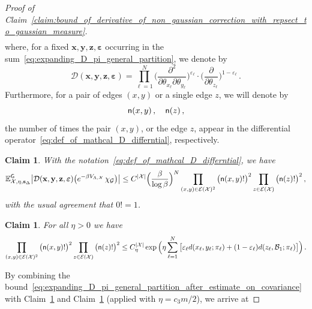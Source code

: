 \documentclass[11pt]{article}
\newtheorem{claim}[theorem]{Claim}
\theoremstyle{definition}
\theoremstyle{remark}
\numberwithin{theorem}{section}
\def\eps{{\varepsilon}}
\def\La{{\Lambda}}
\newcommand{\bE}{\mathbb E}
\newcommand{\cE}{\mathcal{E}}
\begin{document}
\begin{proof}[Proof of Claim~\ref{claim:bound_of_derivative_of_non_gaussian_correction_with_repsect_to_gaussian_measure}]
\begin{align}
        \end{align}
        where, for a fixed $\mathbf{x},\mathbf{y},\mathbf{z}, \boldsymbol{\eps}$ occurring in the sum~\eqref{eq:expanding_D_pi_general_partition}, we denote by 
        \begin{equation} \label{eq:def_of_mathcal_D_differntial}
           \mathcal{D}(\mathbf{x},\mathbf{y},\mathbf{z}, \boldsymbol{\eps} ) = \prod_{\ell=1}^{N} \Big(\frac{\partial^2}{\partial \theta_{x_\ell}\partial \theta_{y_\ell}} \Big)^{\eps_\ell} \cdot \Big(\frac{\partial}{\partial \theta_{ z_{\ell}}}\Big)^{1-\eps_\ell} \, . 
        \end{equation}
        Furthermore, for a pair of edges $(x,y)$ or a single edge $z$, we will denote by
        \begin{equation*}
            {\sf n}(x,y) \, , \quad {\sf n}(z)\, , 
        \end{equation*}
        the number of times the pair $(x,y)$, or the edge $z$, appear in the differential operator~\eqref{eq:def_of_mathcal_D_differntial}, respectively. 
        \begin{claim} \label{claim:bound_of_expectation_of_derivative_mathcal_D}
            With the notation~\eqref{eq:def_of_mathcal_D_differntial}, we have
            \[
            \bE_{\mathcal{X},\eta,\mathbf{s}_{\Delta}}^{\sf G} \big|\mathcal{D}(\mathbf{x},\mathbf{y},\mathbf{z}, \boldsymbol{\eps} ) \big(e^{-\beta V_{\La,\mathcal{X}}} \, \chi_{\mathcal{G}} \big)\big| \le  C^{|\mathcal{X}|} \Big(\frac{\beta}{\log \beta}\Big)^N  \prod_{(x,y)\in \cE(\mathcal{X})^2} \big({\sf n}(x,y)!\big)^2 \prod_{z\in \cE(\mathcal{X})} \big( {\sf n}(z)!\big)^2 \, ,
            \]
            with the usual agreement that $0! = 1$. 
        \end{claim}
        \begin{claim} \label{claim:combinatorial_estimate_on_sum_of_factorials}
        For all $\eta>0$ we have 
          \[
          \prod_{(x,y)\in \cE(\mathcal{X})^2} \big({\sf n}(x,y)!\big)^2 \prod_{z\in \cE(\mathcal{X})} \big({\sf n}(z)! \big)^2 \le C_\eta^{|\mathcal{X}|} \exp\Big(\eta \sum_{\ell=1}^{N} \big[\eps_\ell d(x_\ell,y_\ell;\pi_\ell) + (1-\eps_\ell) d(z_\ell, \mathcal{B}_1 ; \pi_\ell)\big]  \Big) \, .
          \]
        \end{claim}
        \noindent
        By combining the bound~\eqref{eq:expanding_D_pi_general_partition_after_estimate_on_covariance} with Claim~\ref{claim:bound_of_expectation_of_derivative_mathcal_D} and Claim~\ref{claim:combinatorial_estimate_on_sum_of_factorials} (applied with $\eta = c_3m/2$), we arrive at 

\end{proof}
\end{document}
